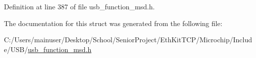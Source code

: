 Definition at line 387 of file usb\+\_\+function\+\_\+msd.\+h.



The documentation for this struct was generated from the following file\+:\begin{DoxyCompactItemize}
\item 
C\+:/\+Users/mainuser/\+Desktop/\+School/\+Senior\+Project/\+Eth\+Kit\+T\+C\+P/\+Microchip/\+Include/\+U\+S\+B/\hyperlink{usb__function__msd_8h}{usb\+\_\+function\+\_\+msd.\+h}\end{DoxyCompactItemize}
